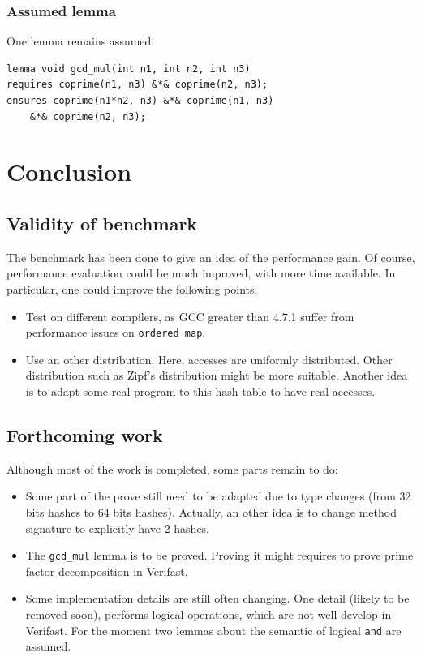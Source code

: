 \documentclass[oneside]{article}
\begin{document}
\subsubsection{Assumed lemma}
One lemma remains assumed: 
\begin{lemma}
	\begin{lstlisting}
lemma void gcd_mul(int n1, int n2, int n3)
requires coprime(n1, n3) &*& coprime(n2, n3);
ensures coprime(n1*n2, n3) &*& coprime(n1, n3) 
	&*& coprime(n2, n3);
	\end{lstlisting}
\end{lemma}


\section{Conclusion}
\subsection{Validity of benchmark}
The benchmark has been done to give an idea of the performance gain. Of course, performance evaluation could be much improved, with more time available. In particular, one could improve the following points: 
\begin{itemize}
	\item Test on different compilers, as GCC greater than 4.7.1 suffer from performance issues on \texttt{ordered map}.
	\item Use an other distribution. Here, accesses are uniformly distributed. Other distribution such as Zipf's distribution might be more suitable. Another idea is to adapt some real program to this hash table to have real accesses.
\end{itemize}

\subsection{Forthcoming work}
Although most of the work is completed, some parts remain to do: 
\begin{itemize}
	\item Some part of the prove still need to be adapted due to type changes (from 32 bits hashes to 64 bits hashes). Actually, an other idea is to change method signature to explicitly have 2 hashes.
	\item The \texttt{gcd\_mul} lemma is to be proved. Proving it might requires to prove prime factor decomposition in Verifast. 
	\item Some implementation details are still often changing. One detail (likely to be removed soon), performs logical operations, which are not well develop in Verifast. For the moment two lemmas about the semantic of logical \texttt{and} are assumed.
\end{itemize}
\end{document}
